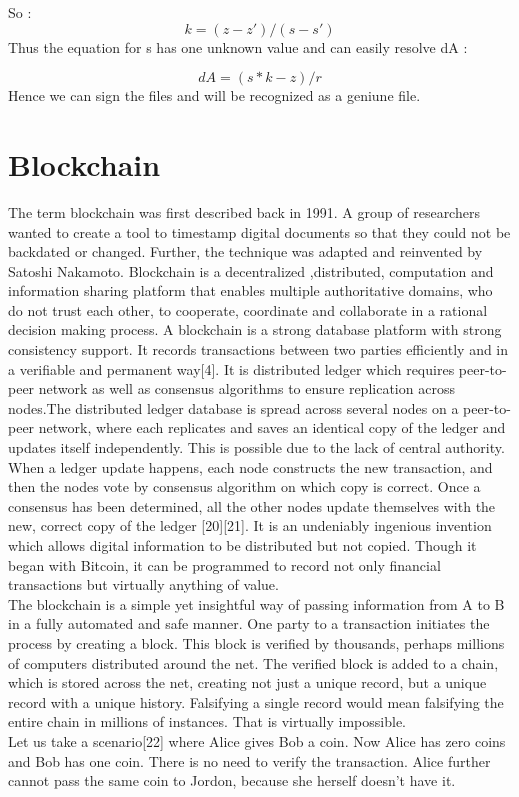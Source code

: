 \documentclass{article}
\begin{document}
So :$$ k = (z - z') / (s - s')$$
Thus the equation for s has one unknown value and can easily resolve dA :

$$dA = (s*k - z) / r$$
 Hence we can sign the files and will be recognized as a geniune file. 




\section{Blockchain}
The term blockchain was first described back in 1991. A group of researchers wanted to create a tool to timestamp digital documents so that they could not be backdated or changed. Further, the technique was adapted and reinvented by Satoshi Nakamoto.
Blockchain is a decentralized ,distributed, computation and information sharing platform that enables multiple authoritative domains, who do not trust each other, to cooperate, coordinate and collaborate in a rational decision making process. A blockchain is a strong database platform with strong consistency support. It records transactions between two parties efficiently and in a verifiable and permanent way[4]. It is distributed ledger which requires peer-to-peer network as well as consensus algorithms to ensure replication across nodes.The distributed ledger database is spread across several nodes on a peer-to-peer network, where each replicates and saves an identical copy of the ledger and updates itself independently. This is possible due to the lack of central authority. When a ledger update happens, each node constructs the new transaction, and then the nodes vote by consensus algorithm on which copy is correct. Once a consensus has been determined, all the other nodes update themselves with the new, correct copy of the ledger [20][21]. It is an undeniably ingenious invention which allows digital information to be distributed but not copied. Though it began with Bitcoin, it can be programmed to record not only financial transactions but virtually anything of value.\\
The blockchain is a simple yet insightful way of passing information from A to B in a fully automated and safe manner. One party to a transaction initiates the process by creating a block. This block is verified by thousands, perhaps millions of computers distributed around the net. The verified block is added to a chain, which is stored across the net, creating not just a unique record, but a unique record with a unique history. Falsifying a single record would mean falsifying the entire chain in millions of instances. That is virtually impossible. \\
Let us take a scenario[22] where Alice gives Bob a coin. Now Alice has zero coins and Bob has one coin. There is no need to verify the transaction. Alice further cannot pass the same coin to Jordon, because she herself doesn't have it.
\end{document}
